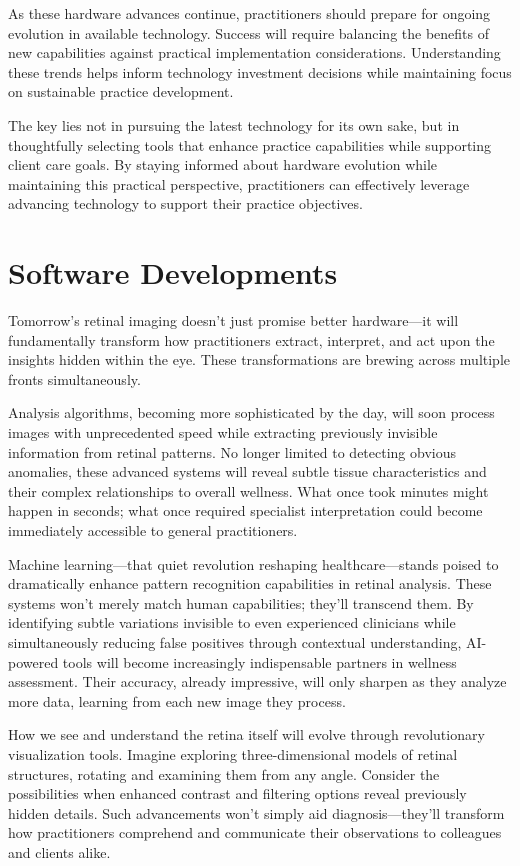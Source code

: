 \documentclass[
  Letterpaper,
]{scrbook}
\begin{document}
As these hardware advances continue, practitioners should prepare for
ongoing evolution in available technology. Success will require
balancing the benefits of new capabilities against practical
implementation considerations. Understanding these trends helps inform
technology investment decisions while maintaining focus on sustainable
practice development.

The key lies not in pursuing the latest technology for its own sake, but
in thoughtfully selecting tools that enhance practice capabilities while
supporting client care goals. By staying informed about hardware
evolution while maintaining this practical perspective, practitioners
can effectively leverage advancing technology to support their practice
objectives.

\section{Software Developments}\label{software-developments}

Tomorrow's retinal imaging doesn't just promise better hardware---it
will fundamentally transform how practitioners extract, interpret, and
act upon the insights hidden within the eye. These transformations are
brewing across multiple fronts simultaneously.

Analysis algorithms, becoming more sophisticated by the day, will soon
process images with unprecedented speed while extracting previously
invisible information from retinal patterns. No longer limited to
detecting obvious anomalies, these advanced systems will reveal subtle
tissue characteristics and their complex relationships to overall
wellness. What once took minutes might happen in seconds; what once
required specialist interpretation could become immediately accessible
to general practitioners.

Machine learning---that quiet revolution reshaping healthcare---stands
poised to dramatically enhance pattern recognition capabilities in
retinal analysis. These systems won't merely match human capabilities;
they'll transcend them. By identifying subtle variations invisible to
even experienced clinicians while simultaneously reducing false
positives through contextual understanding, AI-powered tools will become
increasingly indispensable partners in wellness assessment. Their
accuracy, already impressive, will only sharpen as they analyze more
data, learning from each new image they process.

How we see and understand the retina itself will evolve through
revolutionary visualization tools. Imagine exploring three-dimensional
models of retinal structures, rotating and examining them from any
angle. Consider the possibilities when enhanced contrast and filtering
options reveal previously hidden details. Such advancements won't simply
aid diagnosis---they'll transform how practitioners comprehend and
communicate their observations to colleagues and clients alike.
\end{document}
